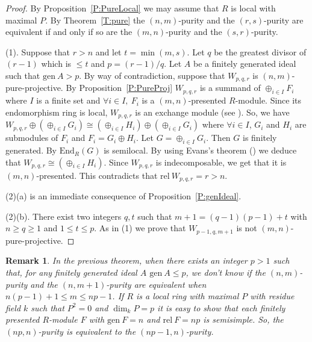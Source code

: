 \documentclass{amsart}
\newtheorem{remark}[theorem]{Remark}
\begin{document}
\begin{proof} By Proposition~\ref{P:PureLocal} we may assume that $R$ is local with maximal $P$. By Theorem~\ref{T:pure} the $(n,m)$-purity and the $(r,s)$-purity are equivalent if and only if so are the $(m,n)$-purity and the $(s,r)$-purity.
 
(1). Suppose that $r>n$ and let $t=\min(m,s)$. Let $q$ be the greatest divisor of $(r-1)$ which is $\leq t$ and $p=(r-1)/q$. Let $A$ be a finitely generated ideal such that $\mathrm{gen}\ A>p$. By way of contradiction, suppose that $W_{p,q,r}$ is $(n,m)$-pure-projective. By Proposition~\ref{P:PureProj} $W_{p,q,r}$ is a summand of $\oplus_{i\in I}F_i$ where $I$ is a finite set and $\forall i\in I,\ F_i$ is a $(m,n)$-presented $R$-module. Since its  endomorphism ring is local, $W_{p,q,r}$ is an exchange module (see \cite[Theorem 2.8]{Fac98}). So, we have $W_{p,q,r}\oplus(\oplus_{i\in I}G_i)\cong(\oplus_{i\in I}H_i)\oplus(\oplus_{i\in I}G_i)$ where $\forall i\in I$, $G_i$ and $H_i$ are submodules of $F_i$ and $F_i=G_i\oplus H_i$. Let $G=\oplus_{i\in I}G_i$. Then $G$ is finitely generated. By \cite[Proposition V.7.1]{FuSa01} $\mathrm{End}_R(G)$ is semilocal. By using Evans's theorem (\cite[Corollary 4.6]{Fac98}) we deduce that $W_{p,q,r}\cong(\oplus_{i\in I}H_i)$. Since $W_{p,q,r}$ is indecomposable, we get that it is $(m,n)$-presented. This contradicts that $\mathrm{rel}\ W_{p,q,r}=r>n$.

(2)(a) is an immediate consequence of Proposition~\ref{P:genIdeal}.

(2)(b). There exist two integers $q,t$ such that $m+1=(q-1)(p-1)+t$ with $n\geq q\geq 1$ and $1\leq t\leq p$. As in (1) we prove that $W_{p-1,q,m+1}$ is not $(m,n)$-pure-projective. 
\end{proof}

\begin{remark}
In the previous theorem, when there exists an integer $p>1$ such that, for any finitely generated ideal $A$ $\mathrm{gen}\ A\leq p$, we don't know if the $(n,m)$-purity and the  $(n,m+1)$-purity are equivalent when $n(p-1)+1\leq m\leq np-1$. If $R$ is a local ring with maximal $P$ with residue field $k$ such that $P^2=0$ and $\dim_kP=p$ it is easy to show that each finitely presented $R$-module $F$ with $\mathrm{gen}\ F=n$ and $\mathrm{rel}\ F=np$ is semisimple. So, the $(np,n)$-purity is equivalent to the $(np-1,n)$-purity.
\end{remark}
\end{document}
